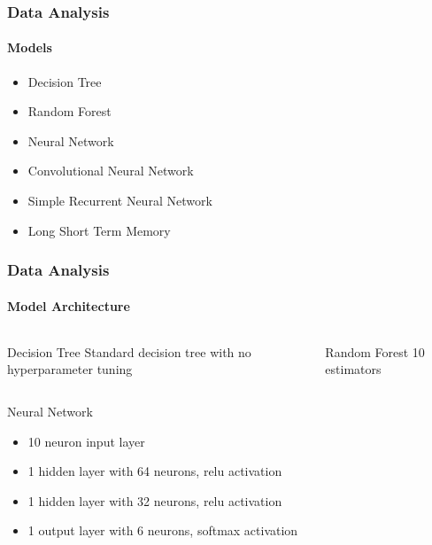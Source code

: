 \documentclass[
	11pt, %
]{beamer}
\begin{document}
\begin{frame}
    \frametitle{Data Analysis}
    \framesubtitle{Models}
    
    \begin{itemize}
        \item Decision Tree
        \item Random Forest
        \item Neural Network
        \item Convolutional Neural Network
        \item Simple Recurrent Neural Network
        \item Long Short Term Memory
    \end{itemize}
\end{frame}

\begin{frame}
    \frametitle{Data Analysis}
    \framesubtitle{Model Architecture}

    \begin{columns}
        \begin{block}{Decision Tree}
            Standard decision tree with no hyperparameter tuning
        \end{block}

        \begin{block}{Random Forest}
            10 estimators
        \end{block}
    \end{columns}

    \begin{block}{Neural Network}
        \begin{itemize}
            \item 10 neuron input layer
            \item 1 hidden layer with 64 neurons, relu activation
            \item 1 hidden layer with 32 neurons, relu activation
            \item 1 output layer with 6 neurons, softmax activation
        \end{itemize}
    \end{block}

\end{frame}
\end{document}
